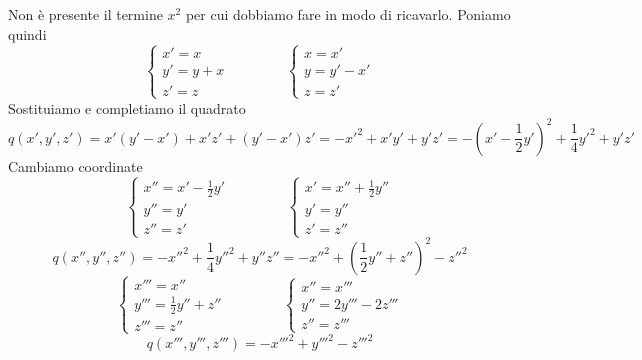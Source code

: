 \documentclass{article}     %
\begin{document}
\begin{ex}
    [Sia $V=\R^3$ e $\beta = \{e_1,e_2,e_3\}$ la base canonica di $V$. In questa base sia $q(x,y,z)=xy+xz+yz$ una forma quadratica: diagonalizzarla.]
    Non è presente il termine $x^2$ per cui dobbiamo fare in modo di ricavarlo. Poniamo quindi
    \[\begin{cases}
        x'=x\\
        y'=y+x\\
        z'=z
    \end{cases}\qquad \qquad \begin{cases}
        x=x'\\
        y=y'-x'\\
        z=z'
    \end{cases}\]
    Sostituiamo e completiamo il quadrato
    \[q(x',y',z')=x'(y'-x')+x'z'+(y'-x')z'= -{x'}^2+x'y'+y'z'=-\left(x'-\frac{1}{2}y'\right)^2+\frac{1}{4}{y'}^2+y'z'\]
    Cambiamo coordinate
    \[\begin{cases}
        x''=x'-\frac{1}{2}y'\\
        y''=y'\\
        z''=z'
    \end{cases}\qquad \qquad \begin{cases}
        x'=x''+\frac{1}{2}y''\\
        y'=y''\\
        z'=z''
    \end{cases}\]
    \[q(x'',y'',z'')=-{x''}^2+\frac{1}{4}{y''}^2+y''z''=-{x''}^2+\left( \frac{1}{2}y''+z'' \right)^2-{z''}^2\]
    \[\begin{cases}
        x'''=x''\\
        y'''=\frac{1}{2}y''+z''\\
        z'''=z''
    \end{cases}\qquad \qquad \begin{cases}
        x''=x'''\\
        y''=2y'''-2z'''\\
        z''=z'''
    \end{cases}\]
    \[q(x''',y''',z''')=-{x'''}^2+{y'''}^2-{z'''}^2\]


\end{ex}
\end{document}
